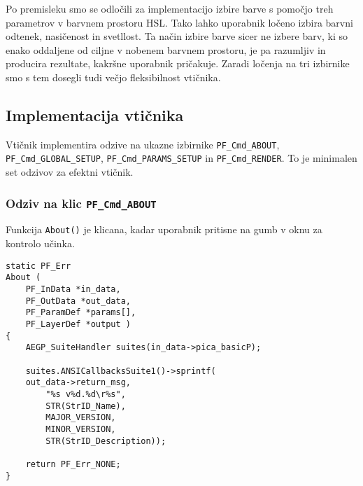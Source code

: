 \documentclass[a4paper, 12pt]{book}
\begin{document}
Po premisleku smo se odločili za implementacijo izbire barve s pomočjo treh parametrov v barvnem prostoru HSL\cite{colordiff1}.
Tako lahko uporabnik ločeno izbira barvni odtenek, nasičenost in svetllost.
Ta način izbire barve sicer ne izbere barv, ki so enako oddaljene od ciljne v nobenem barvnem prostoru, je pa razumljiv in producira rezultate, kakršne uporabnik pričakuje.
Zaradi ločenja na tri izbirnike smo s tem dosegli tudi večjo fleksibilnost vtičnika.


\subsection{Implementacija vtičnika}

Vtičnik implementira odzive na ukazne izbirnike \texttt{PF\_Cmd\_ABOUT}, \texttt{PF\_Cmd\_GLOBAL\_SETUP}, \texttt{PF\_Cmd\_PARAMS\_SETUP} in \texttt{PF\_Cmd\_RENDER}.
To je minimalen set odzivov za efektni vtičnik.


\subsubsection{Odziv na klic \texttt{PF\_Cmd\_ABOUT}}
Funkcija \texttt{About()} je klicana, kadar uporabnik pritisne na gumb  v oknu za kontrolo učinka.
\begin{verbatim}
static PF_Err 
About (	
    PF_InData *in_data,
    PF_OutData *out_data,
    PF_ParamDef *params[],
    PF_LayerDef *output )
{
    AEGP_SuiteHandler suites(in_data->pica_basicP);
	
    suites.ANSICallbacksSuite1()->sprintf(
    out_data->return_msg,
        "%s v%d.%d\r%s",
        STR(StrID_Name), 
        MAJOR_VERSION, 
        MINOR_VERSION, 
        STR(StrID_Description));

    return PF_Err_NONE;
}
\end{verbatim}
\end{document}
